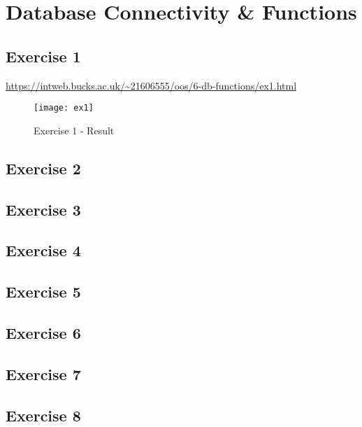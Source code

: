 \chapter{Database Connectivity \& Functions}
\graphicspath{{6-db-functions/images/}}

\section{Exercise 1}

\url{https://intweb.bucks.ac.uk/~21606555/oos/6-db-functions/ex1.html}

\captionsetup{type=figure}


\clearpage
\captionsetup{type=figure}


\begin{figure}[H]
  \caption{Exercise 1 - Result}
  \centering
  \texttt{[image: ex1]}
\end{figure}

\section{Exercise 2}
\section{Exercise 3}
\section{Exercise 4}
\section{Exercise 5}
\section{Exercise 6}
\section{Exercise 7}
\section{Exercise 8}
